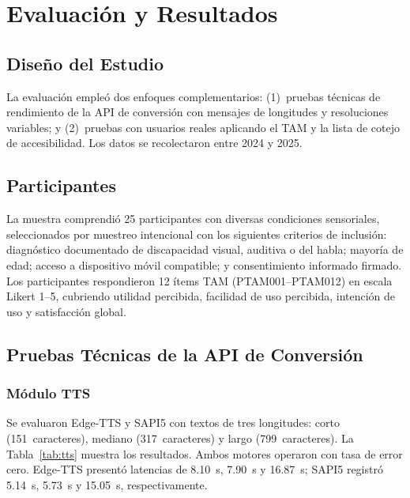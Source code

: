\documentclass[journal]{IEEEtran}
\begin{document}
\section{Evaluaci\'on y Resultados}
\label{sec:evaluacion}

\subsection{Dise\~no del Estudio}

La evaluaci\'on emple\'o dos enfoques complementarios: (1)~pruebas t\'ecnicas de rendimiento de la API de conversi\'on con mensajes de longitudes y resoluciones variables; y (2)~pruebas con usuarios reales aplicando el TAM \cite{davis1989} y la lista de cotejo de accesibilidad. Los datos se recolectaron entre 2024 y 2025.

\subsection{Participantes}

La muestra comprendi\'o 25 participantes con diversas condiciones sensoriales, seleccionados por muestreo intencional con los siguientes criterios de inclusi\'on: diagn\'ostico documentado de discapacidad visual, auditiva o del habla; mayor\'ia de edad; acceso a dispositivo m\'ovil compatible; y consentimiento informado firmado. Los participantes respondieron 12 \'items TAM (PTAM001--PTAM012) en escala Likert 1--5, cubriendo utilidad percibida, facilidad de uso percibida, intenci\'on de uso y satisfacci\'on global.

\subsection{Pruebas T\'ecnicas de la API de Conversi\'on}

\subsubsection{M\'odulo TTS}

Se evaluaron Edge-TTS y SAPI5 con textos de tres longitudes: corto (151~caracteres), mediano (317~caracteres) y largo (799~caracteres). La Tabla~\ref{tab:tts} muestra los resultados. Ambos motores operaron con tasa de error cero. Edge-TTS present\'o latencias de 8.10~s, 7.90~s y 16.87~s; SAPI5 registr\'o 5.14~s, 5.73~s y 15.05~s, respectivamente.
\end{document}
